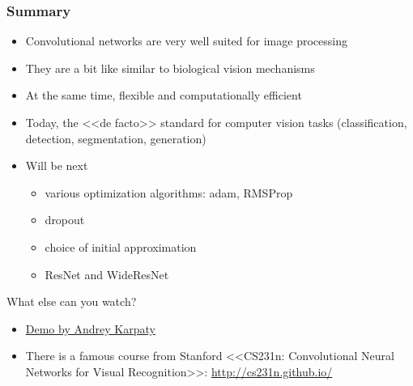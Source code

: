 \documentclass[fullscreen=true, bookmarks=true, hyperref={pdfencoding=unicode}]{beamer}
\begin{document}
\begin{frame}
  \frametitle{Summary}
  \begin{itemize}
    \item Convolutional networks are very well suited for image processing
    \item They are a bit like similar to biological vision mechanisms
    \item At the same time, flexible and computationally efficient
    \item Today, the <<de facto>> standard for computer vision tasks (classification, detection, segmentation, generation)
    \pause
    \item Will be next
      \begin{itemize}
        \item various optimization algorithms: adam, RMSProp
        \item dropout
        \item choice of initial approximation
        \item ResNet and WideResNet
      \end{itemize}
  \end{itemize}

  \pause
  What else can you watch?
  \begin{itemize}
    \item \href{https://cs.stanford.edu/people/karpathy/convnetjs/}{Demo by Andrey Karpaty}
    \item There is a famous course from Stanford <<CS231n: Convolutional Neural Networks for Visual Recognition>>: \href{http://cs231n.github.io/}{http://cs231n.github.io/}
  \end{itemize}
\end{frame}
\end{document}

